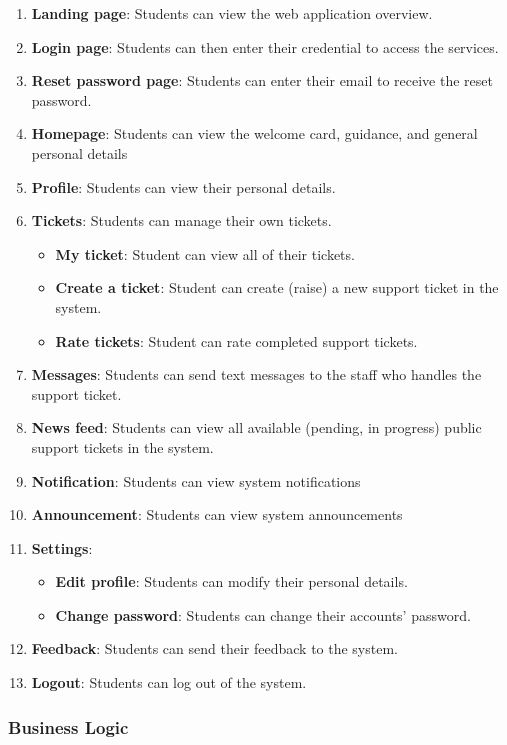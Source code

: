 	\begin{enumerate}
		\item \textbf{Landing page}: Students can view the web application overview.
		\item \textbf{Login page}: Students can then enter their credential to access the services.
		\item \textbf{Reset password page}: Students can enter their email to receive the reset password.
		\item \textbf{Homepage}: Students can view the welcome card, guidance, and general personal details
		\item \textbf{Profile}: Students can view their personal details.
		\item \textbf{Tickets}: Students can manage their own tickets.
			\begin{itemize}
				\item \textbf{My ticket}: Student can view all of their tickets.
				\item \textbf{Create a ticket}: Student can create (raise) a new support ticket in the system.
				\item \textbf{Rate tickets}: Student can rate completed support tickets.
			\end{itemize}
		\item \textbf{Messages}: Students can send text messages to the staff who handles the support ticket.
		\item \textbf{News feed}: Students can view all available (pending, in progress) public support tickets in the system.
		\item \textbf{Notification}: Students can view system notifications
		\item \textbf{Announcement}: Students can view system announcements
		\item \textbf{Settings}: 
			\begin{itemize}
				\item \textbf{Edit profile}: Students can modify their personal details.
				\item \textbf{Change password}: Students can change their accounts' password.
			\end{itemize}
		\item \textbf{Feedback}: Students can send their feedback to the system.
		\item \textbf{Logout}: Students can log out of the system.
	\end{enumerate}
	
	\subsubsection{Business Logic}
	

